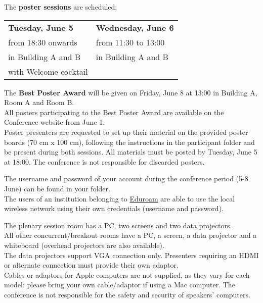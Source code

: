 
\noindent The \textbf{poster sessions} are scheduled:

\begin{center}
\begin{tabular}{ m{6cm} m{6cm} }

  \textbf{Tuesday, June 5} &
  \textbf{Wednesday, June 6} \\

  from 18:30 onwards &
  from 11:30 to 13:00 \\

  in Building A and B &
  in Building A and B \\

  with Welcome cocktail &
\end{tabular}
\end{center}

\noindent The \textbf{Best Poster Award} will be given on Friday, June 8 at 13:00 in Building A, Room A and Room B.\\

\noindent All posters participating to the Best Poster Award are available on the Conference website from June 1.\\
Poster presenters are requested to set up
their material on the provided poster boards (70 cm x 100 cm), following the instructions in the participant folder and be present during both sessions.  
All materials must be posted by Tuesday, June 5 at 18:00.
The conference is not responsible for discarded posters.


\noindent The username and password of your account during the conference period (5-8 June) can be found in your folder. \\
The users of an institution belonging to \href{https://www.eduroam.org/}{Eduroam} are able to use the local wireless network using their own credentials (username and password).

The plenary session room has a PC, two screens and two data projectors.\\ 
All other concurrent/breakout rooms have a PC, a screen, a data projector and a whiteboard (overhead projectors are also available).\\
The data projectors support VGA connection only. Presenters requiring an HDMI or alternate connection must provide their own adaptor.\\
Cables or adaptors for Apple computers are not supplied, as they vary for each model: please bring your own cable/adaptor if using a Mac computer. 
The conference is not responsible for the safety and security of speakers' computers.

